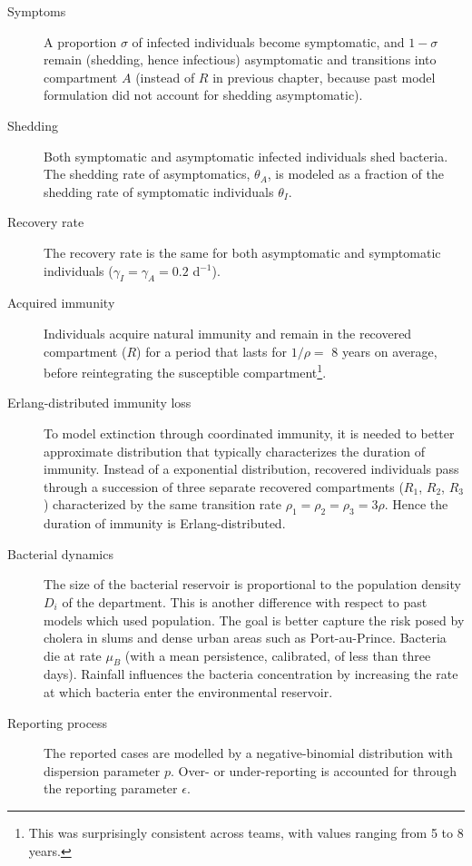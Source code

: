 \begin{description}
    \item[Symptoms] A proportion $\sigma$ of infected individuals become symptomatic, and $1-\sigma$ remain (shedding, hence infectious) asymptomatic and transitions into compartment $A$ (instead of $R$ in previous chapter, because past model formulation did not account for shedding asymptomatic).
    \item[Shedding] Both symptomatic and asymptomatic infected individuals shed bacteria. The shedding rate of asymptomatics, $\theta_A$, is modeled as a fraction of the shedding rate of symptomatic individuals  $\theta_I$\cite{Kuhn:GlucoseNotRiceBased:2014}.
    \item[Recovery rate] The recovery rate is the same for both asymptomatic and symptomatic individuals ($\gamma_I=\gamma_A=0.2$ d$^{-1}$)\cite{Kaper:Cholera:1995, Codeco:EndemicEpidemicDynamics:2001}.
    \item[Acquired immunity] Individuals acquire natural immunity and remain in the recovered compartment ($R$) for a period that lasts for $1/\rho=$ 8 years on average, before reintegrating the susceptible compartment\footnote{This was surprisingly consistent across teams, with values ranging from 5 to 8 years.}.
    \item[Erlang-distributed immunity loss] To model extinction through coordinated immunity, it is needed to better approximate distribution that typically characterizes the duration of immunity\cite{King:InapparentInfectionsCholera:2008}. Instead of a exponential distribution, recovered individuals pass through a succession of three separate recovered compartments ($R_1$, $R_2$, $R_3$) characterized by the same transition rate $\rho_1=\rho_2=\rho_3=3\rho$. Hence the duration of immunity is Erlang-distributed.
    \item[Bacterial dynamics] The size of the bacterial reservoir is proportional to the population density $D_i$ of the department. This is another difference with respect to past models which used population. The goal is better capture the risk posed by cholera in slums and dense urban areas such as Port-au-Prince. Bacteria die at rate $\mu_B$ (with a mean persistence, calibrated, of less than three days). Rainfall influences the bacteria concentration by increasing the rate at which bacteria enter the environmental reservoir.
    \item[Reporting process] The reported cases are modelled by a negative-binomial distribution with dispersion parameter $p$. Over- or under-reporting is accounted for through the reporting parameter $\epsilon$.
\end{description}
    
